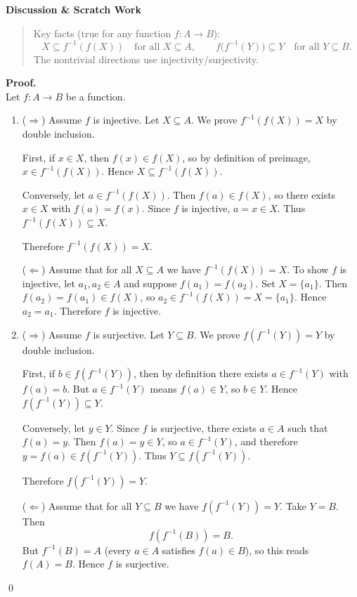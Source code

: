 \documentclass[12pt]{article}
\newenvironment{scratch}{%
  \par\smallskip
  \noindent\textbf{Discussion \& Scratch Work}\begin{quote}\small
}{%
  \end{quote}\smallskip
}
\begin{document}
\begin{scratch}
Key facts (true for any function $f:A\to B$):
\[
X \subseteq f^{-1}(f(X)) \quad \text{for all } X\subseteq A,
\qquad
f\bigl(f^{-1}(Y)\bigr) \subseteq Y \quad \text{for all } Y\subseteq B.
\]
The nontrivial directions use injectivity/surjectivity.
\end{scratch}

\textbf{Proof.}\\
Let $f:A\to B$ be a function.

\begin{enumerate}
\item[(a)] (\(\Rightarrow\)) Assume $f$ is injective. Let $X\subseteq A$.
We prove $f^{-1}(f(X))=X$ by double inclusion.

First, if $x\in X$, then $f(x)\in f(X)$, so by definition of preimage, $x\in f^{-1}(f(X))$.
Hence $X\subseteq f^{-1}(f(X))$.

Conversely, let $a\in f^{-1}(f(X))$. Then $f(a)\in f(X)$, so there exists $x\in X$ with
$f(a)=f(x)$. Since $f$ is injective, $a=x\in X$. Thus $f^{-1}(f(X))\subseteq X$.

Therefore $f^{-1}(f(X))=X$.

(\(\Leftarrow\)) Assume that for all $X\subseteq A$ we have $f^{-1}(f(X))=X$.
To show $f$ is injective, let $a_1,a_2\in A$ and suppose $f(a_1)=f(a_2)$.
Set $X=\{a_1\}$. Then $f(a_2)=f(a_1)\in f(X)$, so $a_2\in f^{-1}(f(X))=X=\{a_1\}$.
Hence $a_2=a_1$. Therefore $f$ is injective.

\item[(b)] (\(\Rightarrow\)) Assume $f$ is surjective. Let $Y\subseteq B$.
We prove $f(f^{-1}(Y))=Y$ by double inclusion.

First, if $b\in f(f^{-1}(Y))$, then by definition there exists $a\in f^{-1}(Y)$ with $f(a)=b$.
But $a\in f^{-1}(Y)$ means $f(a)\in Y$, so $b\in Y$. Hence $f(f^{-1}(Y))\subseteq Y$.

Conversely, let $y\in Y$. Since $f$ is surjective, there exists $a\in A$ such that $f(a)=y$.
Then $f(a)=y\in Y$, so $a\in f^{-1}(Y)$, and therefore $y=f(a)\in f(f^{-1}(Y))$.
Thus $Y\subseteq f(f^{-1}(Y))$.

Therefore $f(f^{-1}(Y))=Y$.

(\(\Leftarrow\)) Assume that for all $Y\subseteq B$ we have $f(f^{-1}(Y))=Y$.
Take $Y=B$. Then
\[
f(f^{-1}(B))=B.
\]
But $f^{-1}(B)=A$ (every $a\in A$ satisfies $f(a)\in B$), so this reads $f(A)=B$.
Hence $f$ is surjective.
\end{enumerate}
\qed
\end{document}
